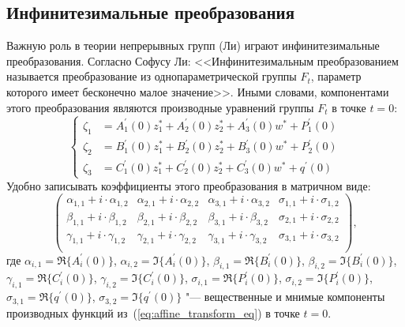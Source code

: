 \documentclass[../main.tex]{subfiles}
\begin{document}
\subsection{Инфинитезимальные преобразования}
Важную роль в теории непрерывных групп (Ли) играют инфинитезимальные преобразования. Согласно Софусу Ли: <<Инфинитезимальным преобразованием называется преобразование из однопараметрической группы $F_t$, параметр которого имеет бесконечно малое значение>>. Иными словами, компонентами этого преобразования являются производные уравнений группы $F_t$ в точке $t = 0$:
\begin{equation*}
	\begin{cases}
     \zeta_1 &=A^{\prime}_{1}(0) z_1^* + A^{\prime}_{2}(0) z_2^* + A^{\prime}_{3}(0) w^* + P^{\prime}_1(0) \\
     \zeta_2 &=B^{\prime}_{1}(0) z_1^* + B^{\prime}_{2}(0) z_2^* + B^{\prime}_{3}(0) w^* + P^{\prime}_2(0) \\
     \zeta_3 &=C^{\prime}_{1}(0) z_1^* + C^{\prime}_{2}(0) z_2^* + C^{\prime}_{3}(0) w^* + q^{\prime}(0)
  \end{cases}
\end{equation*}
Удобно записывать коэффициенты этого преобразования в матричном виде:
\begin{equation}\label{eq:infinitesimal_matrix}
\begin{pmatrix}
\alpha_{1,1} + i\cdot\alpha_{1,2} & \alpha_{2,1} + i\cdot\alpha_{2,2} & \alpha_{3,1} + i\cdot\alpha_{3,2} & \sigma_{1,1} + i\cdot\sigma_{1,2} \\
 \beta_{1,1} +  i\cdot\beta_{1,2} &  \beta_{2,1} +  i\cdot\beta_{2,2} &  \beta_{3,1} +  i\cdot\beta_{3,2} & \sigma_{2,1} + i\cdot\sigma_{2,2} \\
\gamma_{1,1} + i\cdot\gamma_{1,2} & \gamma_{2,1} + i\cdot\gamma_{2,2} & \gamma_{3,1} + i\cdot\gamma_{3,2} & \sigma_{3,1} + i\cdot\sigma_{3,2} \\
\end{pmatrix},
\end{equation}
где $\alpha_{i,1} = \Re\{A^{\prime}_{i}(0)\}$, $\alpha_{i,2} = \Im\{A^{\prime}_{i}(0)\}$, $\beta_{i,1} = \Re\{B^{\prime}_{i}(0)\}$, $\beta_{i,2} = \Im\{B^{\prime}_{i}(0)\}$, $\gamma_{i,1} = \Re\{C^{\prime}_{i}(0)\}$, $\gamma_{i,2} = \Im\{C^{\prime}_{i}(0)\}$, $\sigma_{i,1} = \Re\{P^{\prime}_{i}(0)\}$, $\sigma_{i,2} = \Im\{P^{\prime}_{i}(0)\}$, $\sigma_{3,1} = \Re\{q^{\prime}(0)\}$, $\sigma_{3,2} = \Im\{q^{\prime}(0)\}$ "--- вещественные и мнимые компоненты производных функций из~(\ref{eq:affine_transform_eq}) в точке $t = 0$.
\end{document}
